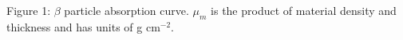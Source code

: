 Figure 1: $\beta$ particle absorption curve. $\mu_m$ is the product of material density and thickness and has units of g cm$^{-2}$.